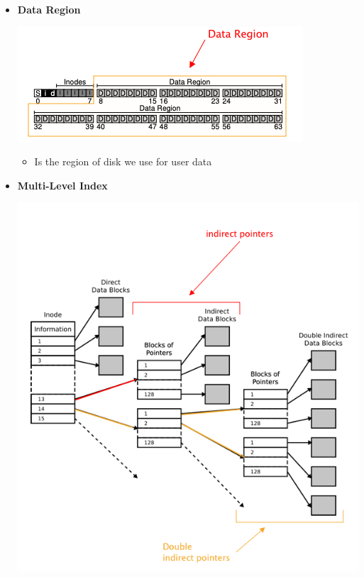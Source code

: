 \documentclass[12pt]{article}
\begin{document}
\begin{itemize}
    \item \textbf{Data Region}

    \begin{center}
    \includegraphics[width=\linewidth]{images/midterm_1_solution_11.png}
    \end{center}

    \begin{itemize}
        \item Is the region of disk we use for user data
    \end{itemize}

    \item \textbf{Multi-Level Index}

    \begin{center}
    \includegraphics[width=\linewidth]{images/midterm_1_solution_13.png}
    \end{center}


\end{itemize}
\end{document}
